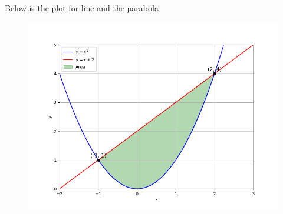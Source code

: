 \documentclass[journal]{IEEEtran}
\begin{document}
Below is the plot for line and the parabola
\begin{figure}[h!]
	\centering
	\includegraphics[width=1\columnwidth]{figs/fig.png}
	\label{stemplot}
\end{figure}
\end{document}

